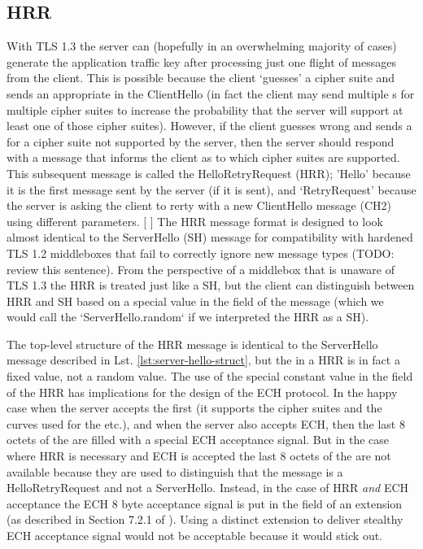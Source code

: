 \subsection{HRR}
With TLS 1.3 the server can (hopefully in an overwhelming majority of cases) generate the application traffic key after processing just one flight of messages from the client. This is possible because the client `guesses' a cipher suite and sends an appropriate  in the ClientHello (in fact the client may send multiple s for multiple cipher suites to increase the probability that the server will support at least one of those cipher suites). However, if the client guesses wrong and sends a  for a cipher suite not supported by the server, then the server should respond with a message that informs the client as to which cipher suites are supported. This subsequent message is called the HelloRetryRequest (HRR); 'Hello' because it is the first message sent by the server (if it is sent), and `RetryRequest' because the server is asking the client to rerty with a new ClientHello message (CH2) using different parameters.
[ ] The HRR message format is designed to look almost identical to the ServerHello (SH) message for compatibility with hardened TLS 1.2 middleboxes that fail to correctly ignore new message types (TODO: review this sentence).
From the perspective of a middlebox that is unaware of TLS 1.3 the HRR is treated just like a SH, but the client can distinguish between HRR and SH based on a special value in the  field of the message (which we would call the `ServerHello.random` if we interpreted the HRR as a SH).

The top-level structure of the HRR message is identical to the ServerHello message described in Lst. \ref{lst:server-hello-struct}, but the  in a HRR is in fact a fixed value, not a random value.
The use of the special constant value in the  field of the HRR has implications for the design of the ECH protocol. In the happy case when the server accepts the first  (it supports the cipher suites and the curves used for the  etc.), and when the server also accepts ECH, then the last 8 octets of the  are filled with a special ECH acceptance signal. But in the case where HRR is necessary and ECH is accepted the last 8 octets of the  are not available because they are used to distinguish that the message is a HelloRetryRequest and not a ServerHello. Instead, in the case of HRR {\em and} ECH acceptance the ECH 8 byte acceptance signal is put in the  field of an  extension (as described in Section 7.2.1 of \cite{esni}). Using a distinct extension to deliver stealthy ECH acceptance signal would not be acceptable because it would stick out.

